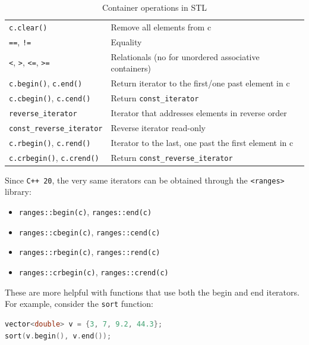 \begin{table}[H]
\begin{tabular}{@{}ll@{}}
    \texttt{c.clear()}              & Remove all elements from c                                                                                \\
    \texttt{==}, \texttt{!=}        & Equality                                                                                                  \\
    \texttt{<}, \texttt{>}, \texttt{<=}, \texttt{>=} & Relationals (no for unordered associative containers)                                    \\ 
    \texttt{c.begin()}, \texttt{c.end()}  & Return iterator to the first/one past element in c \\
    \texttt{c.cbegin()}, \texttt{c.cend()} & Return \texttt{const\_iterator} \\
    \texttt{reverse\_iterator} & Iterator that addresses elements in reverse order \\
    \texttt{const\_reverse\_iterator} & Reverse iterator read-only \\
    \texttt{c.rbegin()}, \texttt{c.rend()} & Iterator to the last, one past the first element in c \\
    \texttt{c.crbegin()}, \texttt{c.crend()} & Return \texttt{const\_reverse\_iterator} \\ \bottomrule
    \end{tabular}
    \caption{Container operations in STL}
\end{table}

Since \texttt{C++ 20}, the very same iterators can be obtained through the \texttt{<ranges>} library:

\begin{itemize}
    \item \texttt{ranges::begin(c)}, \texttt{ranges::end(c)}
    \item \texttt{ranges::cbegin(c)}, \texttt{ranges::cend(c)}
    \item \texttt{ranges::rbegin(c)}, \texttt{ranges::rend(c)}
    \item \texttt{ranges::crbegin(c)}, \texttt{ranges::crend(c)}
\end{itemize}

These are more helpful with functions that use both the begin and end iterators. For example,
consider the \texttt{sort} function:\\

\begin{lstlisting}[language=C++]
vector<double> v = {3, 7, 9.2, 44.3};
sort(v.begin(), v.end());
\end{lstlisting}

